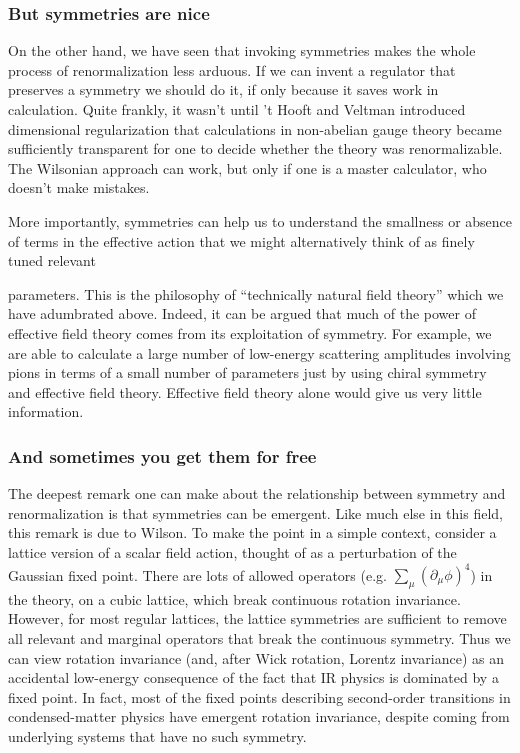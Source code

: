 \subsubsection{But symmetries are nice}

On the other hand, we have seen that invoking symmetries makes the whole
process of renormalization less arduous. If we can invent a regulator that
preserves a symmetry we should do it, if only because it saves work in
calculation. Quite frankly, it wasn't until 't Hooft and Veltman introduced
dimensional regularization that calculations in non-abelian gauge theory became
sufficiently transparent for one to decide whether the theory was renormalizable.
The Wilsonian approach can work, but only if one is a master calculator, who
doesn't make mistakes.

More importantly, symmetries can help us to understand the smallness or absence
of terms in the effective action that we might alternatively think of as finely
tuned relevant

parameters. This is the philosophy of ``technically natural field theory''
which we have adumbrated above. Indeed, it can be argued that much of the power
of effective field theory comes from its exploitation of symmetry. For example,
we are able to calculate a large number of low-energy scattering amplitudes
involving pions in terms of a small number of parameters just by using chiral
symmetry and effective field theory. Effective field theory alone would give us
very little information.

\subsubsection{And sometimes you get them for free}

The deepest remark one can make about the relationship between symmetry and
renormalization is that symmetries can be emergent. Like much else in this
field, this remark is due to Wilson. To make the point in a simple context,
consider a lattice version of a scalar field action, thought of as a
perturbation of the Gaussian fixed point. There are lots of allowed operators
(e.g. $\sum_\mu(\partial_\mu\phi)^4$) in the theory, on a cubic lattice, which
break continuous rotation invariance. However, for most regular lattices, the
lattice symmetries are sufficient to remove all relevant and marginal operators
that break the continuous symmetry. Thus we can view rotation invariance (and,
after Wick rotation, Lorentz invariance) as an accidental low-energy
consequence of the fact that IR physics is dominated by a fixed point. In fact,
most of the fixed points describing second-order transitions in condensed-matter
physics have emergent rotation invariance, despite coming from underlying
systems that have no such symmetry.

